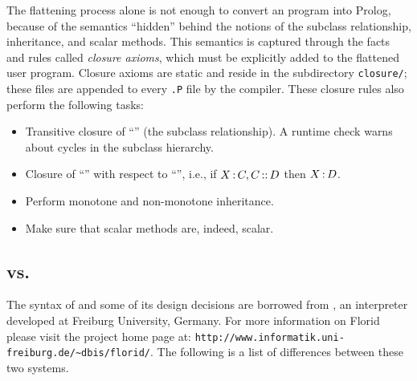 \documentclass[11pt]{report}
\begin{document}
The flattening process alone is not enough to convert an \fl program
into Prolog, because of the semantics ``hidden'' behind the notions of
the subclass relationship, inheritance, and scalar methods. This semantics
is captured through the facts and rules called \emph{closure axioms}, which
must be explicitly added to the flattened user program.  Closure axioms are
static and reside in the subdirectory \texttt{closure/}; these files are
appended to every {\tt *.P} file by the \FLORA compiler. These closure
rules also perform the following tasks:

\begin{itemize}
\item Transitive closure of ``\subcl'' (the subclass relationship).  A
  runtime check warns about cycles in the subclass hierarchy.
\item Closure of ``\isa'' with respect to ``\subcl'', i.e., if $X\,{\bf{:}}\, C,
  C\,{\bf{::}}\, D$ then $X\,{\bf{:}}\, D$.
\item Perform monotone and non-monotone inheritance.
\item Make sure that scalar methods are, indeed, scalar.
\end{itemize}


\subsection{\FLORA vs. \FLORID}

The syntax of \FLORA and some of its design decisions are borrowed from
\FLORID, an \fl interpreter developed at Freiburg University, Germany.
For more information on Florid please visit the project home page at:
\verb|http://www.informatik.uni-freiburg.de/~dbis/florid/|. The following
is a list of differences between these two systems.
\end{document}
